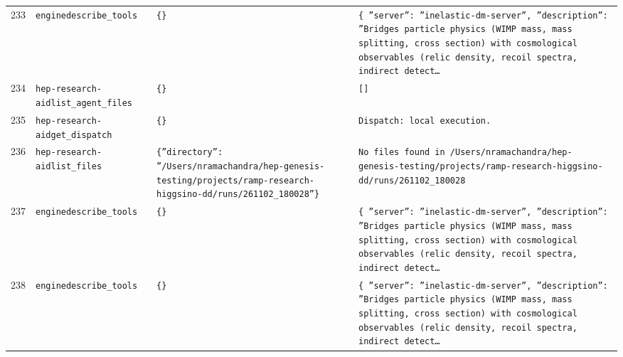 \documentclass[11pt,a4paper]{article}
\begin{document}
\begin{longtable}{@{}p{}p{}p{}p{}@{}}
233 & \texttt{engine}\newline\texttt{describe\_\allowbreak{}tools} & \texttt{\{\}\allowbreak{}} & \texttt{\{   ''server'':\allowbreak{} ''inelastic-dm-server'',\allowbreak{}   ''description'':\allowbreak{} ''Bridges particle physics (WIMP mass,\allowbreak{} mass splitting,\allowbreak{} cross section)\allowbreak{} with cosmological observables (relic density,\allowbreak{} recoil spectra,\allowbreak{} indirect detect\ldots{}\allowbreak{}} \\
234 & \texttt{hep-research-aid}\newline\texttt{list\_\allowbreak{}agent\_\allowbreak{}files} & \texttt{\{\}\allowbreak{}} & \texttt{[]\allowbreak{}} \\
235 & \texttt{hep-research-aid}\newline\texttt{get\_\allowbreak{}dispatch} & \texttt{\{\}\allowbreak{}} & \texttt{Dispatch:\allowbreak{} local execution.} \\
236 & \texttt{hep-research-aid}\newline\texttt{list\_\allowbreak{}files} & \texttt{\{''directory'':\allowbreak{} ''/\allowbreak{}Users/\allowbreak{}nramachandra/\allowbreak{}hep-genesis-testing/\allowbreak{}projects/\allowbreak{}ramp-research-higgsino-dd/\allowbreak{}runs/\allowbreak{}261102\_\allowbreak{}180028''\}\allowbreak{}} & \texttt{No files found in /\allowbreak{}Users/\allowbreak{}nramachandra/\allowbreak{}hep-genesis-testing/\allowbreak{}projects/\allowbreak{}ramp-research-higgsino-dd/\allowbreak{}runs/\allowbreak{}261102\_\allowbreak{}180028} \\
237 & \texttt{engine}\newline\texttt{describe\_\allowbreak{}tools} & \texttt{\{\}\allowbreak{}} & \texttt{\{   ''server'':\allowbreak{} ''inelastic-dm-server'',\allowbreak{}   ''description'':\allowbreak{} ''Bridges particle physics (WIMP mass,\allowbreak{} mass splitting,\allowbreak{} cross section)\allowbreak{} with cosmological observables (relic density,\allowbreak{} recoil spectra,\allowbreak{} indirect detect\ldots{}\allowbreak{}} \\
238 & \texttt{engine}\newline\texttt{describe\_\allowbreak{}tools} & \texttt{\{\}\allowbreak{}} & \texttt{\{   ''server'':\allowbreak{} ''inelastic-dm-server'',\allowbreak{}   ''description'':\allowbreak{} ''Bridges particle physics (WIMP mass,\allowbreak{} mass splitting,\allowbreak{} cross section)\allowbreak{} with cosmological observables (relic density,\allowbreak{} recoil spectra,\allowbreak{} indirect detect\ldots{}\allowbreak{}} \\

\end{longtable}
\end{document}
